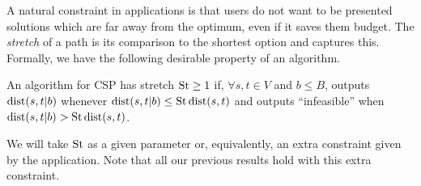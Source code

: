 A natural constraint in applications is that users do not want to be presented solutions which are far away from the optimum, even if it saves them budget.
The \emph{stretch} of a path is its comparison to the shortest option and captures this.
Formally, we have the following desirable property of an algorithm.

\begin{definition}[Stretch]
An algorithm for CSP has stretch $\operatorname{St}\geq 1$ if, $\forall s,t\in V$ and $b\leq B$, outputs $\mbox{dist}(s,t|b)$ whenever $\mbox{dist}(s,t|b)\leq \operatorname{St}\mbox{dist}(s,t)$ and outputs ``infeasible'' when $\mbox{dist}(s,t|b)>\operatorname{St}\mbox{dist}(s,t)$.
\end{definition}
We will take $\operatorname{St}$ as a given parameter or, equivalently, an extra constraint given by the application. 
Note that all our previous results hold with this extra constraint.